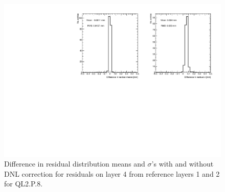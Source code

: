 \begin{figure}
    \centering
    \includegraphics[width = \textwidth]{figures/figure_compare_residual_fits_QL2P08_3100V_2021-06-18_no_dnl_minus_QL2P08_3100V_2021-06-18_2_50um_universal_DNL_layer4_fixedlayers12.pdf}
    \caption{Difference in residual distribution means and $\sigma$'s with and without DNL correction for residuals on layer 4 from reference layers 1 and 2 for QL2.P.8.}
    \label{fig:dnl_compare_fits}
\end{figure}